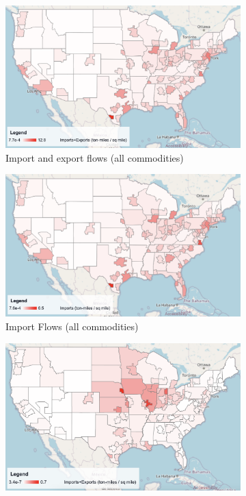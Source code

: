 \begin{figure}[ht]
    \centering
    \begin{subfigure}[b]{0.49\textwidth}
        \centering
        \includegraphics[width=\textwidth]{figures/imports_exports.png}
        \caption{Import and export flows (all commodities)}
        \label{fig:imports_exports}
    \end{subfigure}
    \hfill
    \begin{subfigure}[b]{0.49\textwidth}
        \centering
        \includegraphics[width=\textwidth]{figures/imports.png}
        \caption{Import Flows (all commodities)}
        \label{fig:imports}
    \end{subfigure}
    \hfill
    \begin{subfigure}[b]{0.49\textwidth}
        \centering
        \includegraphics[width=\textwidth]{figures/imports_exports_cereal.png}

\end{subfigure}
\end{figure}
